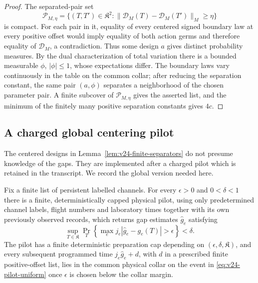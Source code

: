 \begin{proof}
The separated-pair set
\[
 \mathcal P_{M,\eta}=
 \{(T,T')\in\mathfrak K^2:
   \|\mathcal D_M(T)-\mathcal D_M(T')\|_M\ge\eta\}
\]
is compact.  For each pair in it, equality of every centered signed boundary
law at every positive offset would imply equality of both action germs and
therefore equality of \(\mathcal D_M\), a contradiction.  Thus some design
\(a\) gives distinct probability measures.  By the dual characterization of
total variation there is a bounded measurable \(\phi\), \(|\phi|\le1\),
whose expectations differ.  The boundary laws vary continuously in the table
on the common collar; after reducing the separation constant, the same pair
\((a,\phi)\) separates a neighborhood of the chosen parameter pair.  A finite
subcover of \(\mathcal P_{M,\eta}\) gives the asserted list, and the minimum of
the finitely many positive separation constants gives \(4c\).
\end{proof}

\subsection{A charged global centering pilot}

The centered designs in Lemma~\ref{lem:v24-finite-separators} do not presume
knowledge of the gaps.  They are implemented after a charged pilot which is
retained in the transcript.  We record the global version needed here.

\begin{lemma}
\label{lem:v24-global-centering-pilot}
Fix a finite list of persistent labelled channels.  For every
\(\epsilon>0\) and \(0<\delta<1\) there is a finite, deterministically capped
physical pilot, using only predetermined channel labels, flight numbers and
laboratory times together with its own previously observed records, which
returns gap estimates \(\widehat g_e\) satisfying
\begin{equation}\label{eq:v24-pilot-uniform}
 \sup_{T\in\mathfrak K}
 \Pr_T\left\{
  \max_e j_e|\widehat g_e-g_e(T)|>\epsilon
       \right\}<\delta.
\end{equation}
The pilot has a finite deterministic preparation cap depending on
\((\epsilon,\delta,\mathfrak K)\), and every subsequent programmed time
\(j_e\widehat g_e+d\), with \(d\) in a prescribed finite positive-offset
list, lies in the common physical collar on the event in
\eqref{eq:v24-pilot-uniform} once \(\epsilon\) is chosen below the collar
margin.
\end{lemma}


